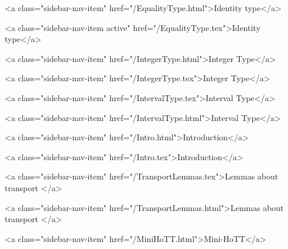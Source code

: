       
        
          <a class="sidebar-nav-item" href="/EqualityType.html">Identity type</a>
        
      
    
      
        
          <a class="sidebar-nav-item active" href="/EqualityType.tex">Identity type</a>
        
      
    
      
        
          <a class="sidebar-nav-item" href="/IntegerType.html">Integer Type</a>
        
      
    
      
        
          <a class="sidebar-nav-item" href="/IntegerType.tex">Integer Type</a>
        
      
    
      
        
          <a class="sidebar-nav-item" href="/IntervalType.tex">Interval Type</a>
        
      
    
      
        
          <a class="sidebar-nav-item" href="/IntervalType.html">Interval Type</a>
        
      
    
      
        
          <a class="sidebar-nav-item" href="/Intro.html">Introduction</a>
        
      
    
      
        
          <a class="sidebar-nav-item" href="/Intro.tex">Introduction</a>
        
      
    
      
        
          <a class="sidebar-nav-item" href="/TransportLemmas.tex">Lemmas about transport </a>
        
      
    
      
        
          <a class="sidebar-nav-item" href="/TransportLemmas.html">Lemmas about transport </a>
        
      
    
      
        
          <a class="sidebar-nav-item" href="/MiniHoTT.html">Mini-HoTT</a>
        
      
    
